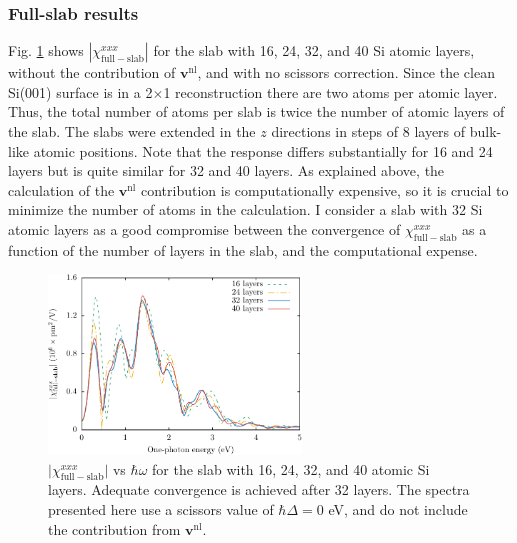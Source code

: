 
\subsubsection{Full-slab results}\label{sec:fsresults}

Fig. \ref{fig:layersconv} shows $|\chi_{\mathrm{full-slab}}^{xxx}|$ for the slab
with 16, 24, 32, and 40 Si atomic layers, without the contribution of
$\mathbf{v}^{\mathrm{nl}}$, and with no scissors correction. Since the clean
Si(001) surface is in a 2$\times$1 reconstruction there are two atoms per atomic
layer. Thus, the total number of atoms per slab is twice the number of atomic
layers of the slab. The slabs were extended in the $z$ directions in steps of 8
layers of bulk-like atomic positions. Note that the response differs
substantially for 16 and 24 layers but is quite similar for 32 and 40 layers. As
explained above, the calculation of the $\mathbf{v}^\mathrm{nl}$ contribution is
computationally expensive, so it is crucial to minimize the number of atoms in
the calculation. I consider a slab with 32 Si atomic layers as a good compromise
between the convergence of $\chi^{xxx}_{\mathrm{full-slab}}$ as a function of
the number of layers in the slab, and the computational expense.

\begin{figure}[b]
\centering 
\includegraphics[width=0.6\textwidth]{content/figures/fig-Si2x1-layerconv}
\caption{$\vert\chi_{\mathrm{full-slab}}^{xxx}\vert$ vs $\hbar\omega$ for the
slab with 16, 24, 32, and 40 atomic Si layers. Adequate convergence is achieved
after 32 layers. The spectra presented here use a scissors value of $\hbar\Delta
= 0$ eV, and do not include the contribution from $\mathbf{v}^{\mathrm{nl}}$.}
\label{fig:layersconv}
\end{figure}



